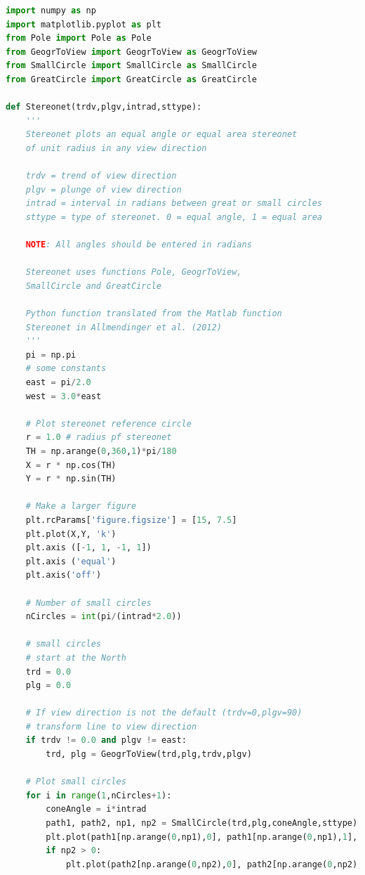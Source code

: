 \documentclass[a4paper , 12pt]{book}
\begin{document}
\begin{lstlisting}[language=Python, frame=single]
import numpy as np
import matplotlib.pyplot as plt
from Pole import Pole as Pole
from GeogrToView import GeogrToView as GeogrToView
from SmallCircle import SmallCircle as SmallCircle
from GreatCircle import GreatCircle as GreatCircle

def Stereonet(trdv,plgv,intrad,sttype):
    '''
	Stereonet plots an equal angle or equal area stereonet 
	of unit radius in any view direction
	
	trdv = trend of view direction
	plgv = plunge of view direction
	intrad = interval in radians between great or small circles 
	sttype = type of stereonet. 0 = equal angle, 1 = equal area
	
	NOTE: All angles should be entered in radians
	
	Stereonet uses functions Pole, GeogrToView, 
	SmallCircle and GreatCircle
	
	Python function translated from the Matlab function
	Stereonet in Allmendinger et al. (2012)
	'''
    pi = np.pi
    # some constants
    east = pi/2.0
    west = 3.0*east
    
    # Plot stereonet reference circle
    r = 1.0 # radius pf stereonet
    TH = np.arange(0,360,1)*pi/180
    X = r * np.cos(TH)
    Y = r * np.sin(TH)
    
    # Make a larger figure
    plt.rcParams['figure.figsize'] = [15, 7.5]
    plt.plot(X,Y, 'k')
    plt.axis ([-1, 1, -1, 1])
    plt.axis ('equal')
    plt.axis('off')
    
    # Number of small circles
    nCircles = int(pi/(intrad*2.0))
    
    # small circles
    # start at the North
    trd = 0.0
    plg = 0.0
    
    # If view direction is not the default (trdv=0,plgv=90)
    # transform line to view direction
    if trdv != 0.0 and plgv != east:
        trd, plg = GeogrToView(trd,plg,trdv,plgv)
    
    # Plot small circles
    for i in range(1,nCircles+1):
        coneAngle = i*intrad
        path1, path2, np1, np2 = SmallCircle(trd,plg,coneAngle,sttype)
        plt.plot(path1[np.arange(0,np1),0], path1[np.arange(0,np1),1], color='gray',linewidth=0.5)
        if np2 > 0:
            plt.plot(path2[np.arange(0,np2),0], path2[np.arange(0,np2),1], color='gray', linewidth=0.5)
    

\end{lstlisting}
\end{document}
